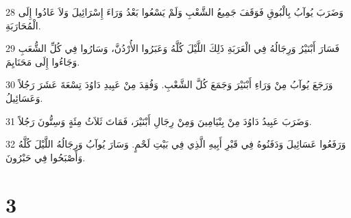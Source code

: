 \par 28 وَضَرَبَ يُوآبُ بِالْبُوقِ فَوَقَفَ جَمِيعُ الشَّعْبِ وَلَمْ يَسْعُوا بَعْدُ وَرَاءَ إِسْرَائِيلَ وَلاَ عَادُوا إِلَى الْمُحَارَبَةِ.
\par 29 فَسَارَ أَبْنَيْرُ وَرِجَالُهُ فِي الْعَرَبَةِ ذَلِكَ اللَّيْلَ كُلَّهُ وَعَبَرُوا الأُرْدُنَّ، وَسَارُوا فِي كُلِّ الشُّعَبِ وَجَاءُوا إِلَى مَحَنَايِمَ.
\par 30 وَرَجَعَ يُوآبُ مِنْ وَرَاءِ أَبْنَيْرَ وَجَمَعَ كُلَّ الشَّعْبِ. وَفُقِدَ مِنْ عَبِيدِ دَاوُدَ تِسْعَةَ عَشَرَ رَجُلاً وَعَسَائِيلُ.
\par 31 وَضَرَبَ عَبِيدُ دَاوُدَ مِنْ بِنْيَامِينَ وَمِنْ رِجَالِ أَبْنَيْرَ، فَمَاتَ ثَلاَثُ مِئَةٍ وَسِتُّونَ رَجُلاً.
\par 32 وَرَفَعُوا عَسَائِيلَ وَدَفَنُوهُ فِي قَبْرِ أَبِيهِ الَّذِي فِي بَيْتِ لَحْمٍ. وَسَارَ يُوآبُ وَرِجَالُهُ اللَّيْلَ كُلَّهُ وَأَصْبَحُوا فِي حَبْرُونَ.

\chapter{3}

